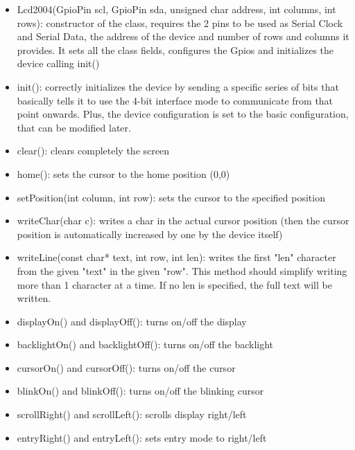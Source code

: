 \documentclass[12pt]{article}
\begin{document}
\begin{itemize}

\item Lcd2004(GpioPin scl, GpioPin sda, unsigned char address, int columns, int rows): constructor of the class, requires the 2 pins to be used as Serial Clock and Serial Data, the address of the device and number of rows and columns it provides.
It sets all the class fields, configures the Gpios and initializes the device calling init()

\item init(): correctly initializes the device by sending a specific series of bits that basically tells it to use the 4-bit interface mode to communicate from that point onwards. Plus, the device configuration is set to the basic configuration, that can be modified later.

\item clear(): clears completely the screen

\item home(): sets the cursor to the home position (0,0)

\item setPosition(int column, int row): sets the cursor to the specified position

\item writeChar(char c): writes a char in the actual cursor position (then the cursor position is automatically increased by one by the device itself)

\item writeLine(const char* text, int row, int len): writes the first "len" character from the given "text" in the given "row". This method should simplify writing more than 1 character at a time. If no len is specified, the full text will be written.

\item displayOn() and displayOff(): turns on/off the display

\item backlightOn() and backlightOff(): turns on/off the backlight

\item cursorOn() and cursorOff(): turns on/off the cursor

\item blinkOn() and blinkOff(): turns on/off the blinking cursor

\item scrollRight() and scrollLeft(): scrolls display right/left

\item entryRight() and entryLeft(): sets entry mode to right/left


\end{itemize}
\end{document}
